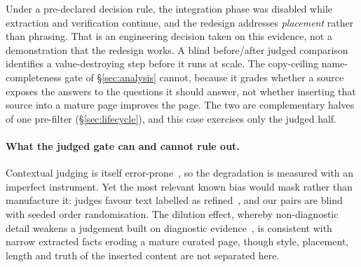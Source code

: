 \documentclass[10pt,twocolumn]{article}
\begin{document}
Under a pre-declared decision rule, the integration phase was disabled while extraction and
verification continue, and the redesign addresses \emph{placement} rather than phrasing. That is an
engineering decision taken on this evidence, not a demonstration that the redesign works. A blind before/after judged comparison identifies a value-destroying step before it runs at
scale. The copy-ceiling name-completeness gate of \S\ref{sec:analysis} cannot, because it
grades whether a source exposes the answers to the questions it should answer, not whether inserting
that source into a mature page improves the page. The two are complementary halves of one pre-filter (\S\ref{sec:lifecycle}), and this case exercises
only the judged half.

\paragraph{What the judged gate can and cannot rule out.} Contextual judging is itself error-prone~\cite{contextualjudgebench2025}, so the degradation is measured with an imperfect instrument. Yet the most relevant known bias would mask rather than manufacture it: judges favour text labelled as refined~\cite{calmjudgebias2024}, and our pairs are blind with seeded order randomisation. The dilution effect, whereby non-diagnostic detail weakens a judgement built on diagnostic evidence~\cite{nisbett1981dilution}, is consistent with narrow extracted facts eroding a mature curated page, though style, placement, length and truth of the inserted content are not separated here.
\end{document}
